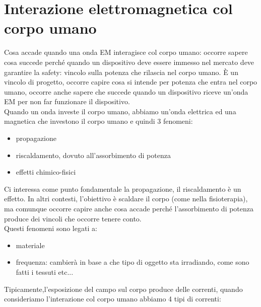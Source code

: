 \documentclass[oneside, 12pt]{extbook}
\begin{document}
\section{Interazione elettromagnetica col corpo umano}
Cosa accade quando una onda EM interagisce col corpo umano: occorre sapere cosa succede perché quando un dispositivo deve essere immesso nel mercato deve garantire la safety: vincolo sulla potenza che rilascia nel corpo umano. È un vincolo di progetto, occorre capire cosa si intende per potenza che entra nel corpo umano, occorre anche sapere che succede quando un dispositivo riceve un'onda EM per non far funzionare il dispositivo.\\Quando un onda investe il corpo umano, abbiamo un'onda elettrica ed una magnetica che investono il corpo umano e quindi 3 fenomeni:
\begin{itemize}
    \item propagazione
    \item riscaldamento, dovuto all'assorbimento di potenza
    \item effetti chimico-fisici
\end{itemize}
Ci interessa come punto fondamentale la propagazione, il riscaldamento è un effetto. In altri contesti, l'obiettivo è scaldare il corpo (come nella fisioterapia), ma comunque occorre capire anche cosa accade perché l'assorbimento di potenza produce dei vincoli che occorre tenere conto.\\Questi fenomeni sono legati a:
\begin{itemize}
	\item materiale
	\item frequenza: cambierà in base a che tipo di oggetto sta irradiando, come sono fatti i tessuti etc...
\end{itemize}
Tipicamente,l'esposizione del campo sul corpo produce delle correnti, quando consideriamo l'interazione col corpo umano abbiamo 4 tipi di correnti:
\end{document}
